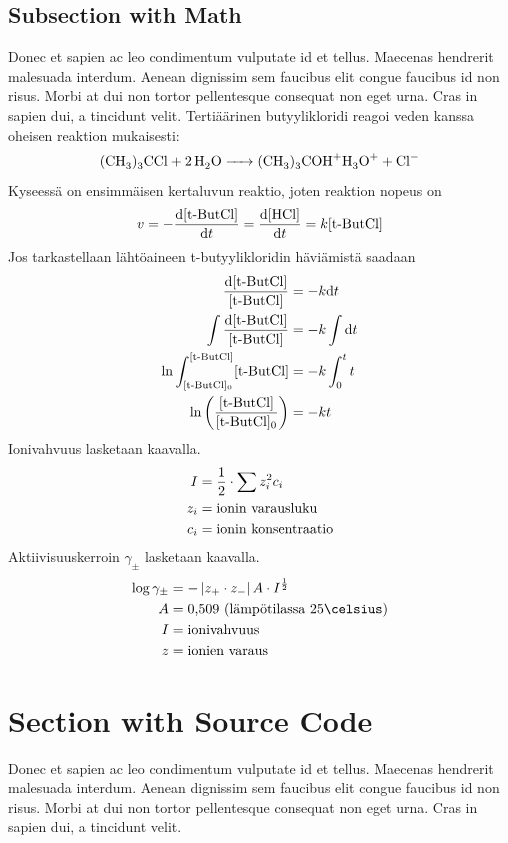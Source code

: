 \documentclass[11pt,a4paper,oneside,article]{memoir}
\newcommand\tn[1]{\textnormal{#1}} %
\newcommand\reaction[1]{\begin{equation}\ce{#1}\end{equation}} %
\begin{document}
\subsection{Subsection with Math}
Donec et sapien ac leo condimentum vulputate id et tellus. Maecenas hendrerit malesuada interdum. Aenean dignissim sem faucibus elit congue faucibus id non risus. Morbi at dui non tortor pellentesque consequat non eget urna. Cras in sapien dui, a tincidunt velit. Tertiäärinen butyylikloridi reagoi veden kanssa oheisen reaktion mukaisesti:
\reaction{(CH3)3CCl + 2H2O -> (CH3)3COH+H3O+ +Cl-}
Kyseessä on ensimmäisen kertaluvun reaktio, joten reaktion nopeus on
\begin{align}
v=-\frac{\mathrm{d}[\tn{t-ButCl}]}{\mathrm{d}t}=\frac{\mathrm{d}[\tn{HCl}]}{\mathrm{d}t}=k[\tn{t-ButCl}]
\end{align}
Jos tarkastellaan lähtöaineen t-butyylikloridin häviämistä saadaan
\begin{align}
\frac{\mathrm{d}[\tn{t-ButCl}]}{[\tn{t-ButCl}]}&=-k\mathrm{d}t \\
\int \frac{\mathrm{d}[\tn{t-ButCl}]}{[\tn{t-ButCl}]}&=-k \int \mathrm{d}t \\
\ln \int_{[\tn{t-ButCl}]_0}^{[\tn{t-ButCl}]} [\tn{t-ButCl}]&=-k\int_0^t t \\
\ln \left( \frac{[\tn{t-ButCl}]}{[\tn{t-ButCl}]_0} \right)&=-kt
\end{align}
Ionivahvuus lasketaan kaavalla.
\begin{align}
I&=\frac{1}{2}\cdot\sum z_i^2c_i \\
z_i&= \tn{ionin varausluku} \\
c_i&= \tn{ionin konsentraatio}
\end{align}
Aktiivisuuskerroin $\gamma_\pm$ lasketaan kaavalla.
\begin{align}
\log \gamma_\pm &= -\left|z_+\cdot z_-\right|A\cdot I^{\frac{1}{2}} \\
A &= \tn{0,509 (lämpötilassa 25\celsius}) \\
I &= \tn{ionivahvuus} \\
z &= \tn{ionien varaus}
\end{align}

\section{Section with Source Code}
Donec et sapien ac leo condimentum vulputate id et tellus. Maecenas hendrerit malesuada interdum. Aenean dignissim sem faucibus elit congue faucibus id non risus. Morbi at dui non tortor pellentesque consequat non eget urna. Cras in sapien dui, a tincidunt velit.
\end{document}
